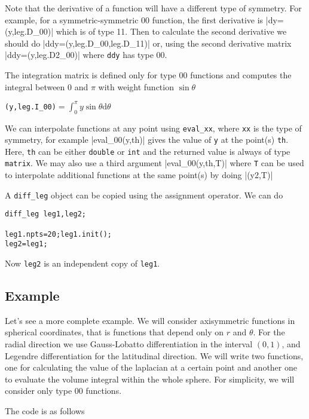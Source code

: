 Note that the derivative of a function will have a different type of symmetry. 
For example, for a symmetric-symmetric 00 function, the first derivative is
|dy=(y,leg.D_00)|
which is of type 11. Then to calculate the second derivative we should do
|ddy=(y,leg.D_00,leg.D_11)|
or, using the second derivative matrix
|ddy=(y,leg.D2_00)|
where \texttt{ddy} has type 00.

The integration matrix is defined only for type 00 functions and computes the integral between 0 and $\pi$
with weight function $\sin\theta$

\verb|(y,leg.I_00)|$\displaystyle=\int_0^{\pi}y\sin\theta\mathrm{d}\theta$

We can interpolate functions at any point using \texttt{eval\_xx}, where \texttt{xx} is the type
of symmetry, for example
|eval_00(y,th)|
gives the value of \texttt{y} at the point(s) \texttt{th}. Here, \texttt{th} can be either 
\texttt{double} or \texttt{int} and the returned value is always of type \texttt{matrix}.
We may also use a third argument
|eval_00(y,th,T)|
where \texttt{T} can be used to interpolate additional functions at the same point(s) by doing
|(y2,T)|

A {\tt diff\_leg} object can be copied using the assignment operator. We can do
\begin{verbatim}
diff_leg leg1,leg2;

leg1.npts=20;leg1.init();
leg2=leg1; 
\end{verbatim}
Now {\tt leg2} is an independent copy of {\tt leg1}.
\subsection{Example}

Let's see a more complete example. We will consider axisymmetric functions in spherical coordinates, 
that is functions that depend only on $r$ and $\theta$. For the radial direction we use
Gauss-Lobatto differentiation in the interval $(0,1)$, and Legendre differentiation for the
latitudinal direction. We will write two functions, one for calculating the value of the laplacian
at a certain point and another one to evaluate the volume integral within the whole sphere.
For simplicity, we will consider only type 00 functions.

The code is as follows

